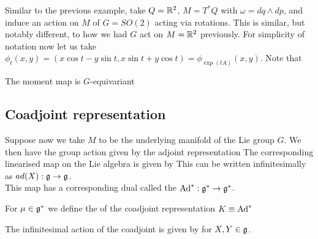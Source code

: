 \documentclass{article}
\begin{document}
\begin{example}
Similar to the previous example, take $Q = \mathbb{R}^2$, $M= T^\ast Q$ with $\omega = dq \wedge dp$, and induce an action on $M$ of $G=SO(2)$ acting via rotations. This is similar, but notably different, to how we had $G$ act on $M=\mathbb{R}^2$ previously. For simplicity of notation now let us take $\phi_t(x,y) = (x\cos t - y \sin t, x\sin t + y \cos t ) = \phi_{\exp(tA)}(x,y)$. Note that 
\end{example}

\begin{prop}
The moment map is $G$-equivariant
\end{prop}

\subsection{Coadjoint representation}
Suppose now we take $M$ to be the underlying manifold of the Lie group $G$. We then have the group action given by the adjoint representation 
The corresponding linearised map on the Lie algebra is given by 
This can be written infinitesimally as $ad(X):\mathfrak{g} \to \mathfrak{g}$.\\
This map has a corresponding dual called the  $\operatorname{Ad}^\ast : \mathfrak{g}^\ast \to \mathfrak{g}^\ast$.

\begin{definition}
For $\mu \in \mathfrak{g}^\ast$ we define the  of the coadjoint representation $K \equiv \operatorname{Ad}^\ast$
\end{definition}
The infinitesimal action of the coadjoint is given by 
for $X,Y \in \mathfrak{g}$.
\end{document}
